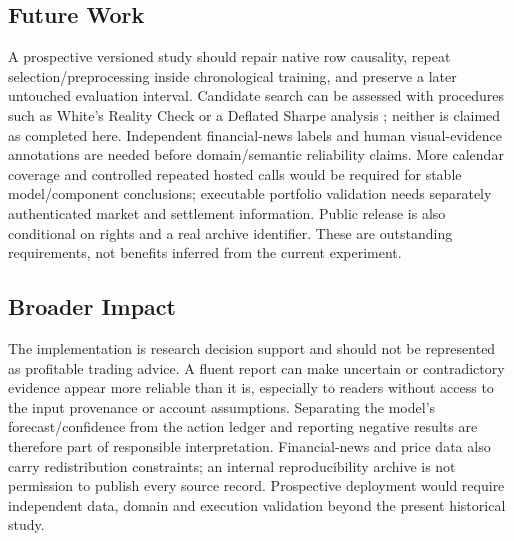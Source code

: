\subsection{Future Work}
A prospective versioned study should repair native row causality, repeat selection/preprocessing inside chronological training, and preserve a later untouched evaluation interval. Candidate search can be assessed with procedures such as White's Reality Check or a Deflated Sharpe analysis \cite{white2000reality,bailey2014deflated}; neither is claimed as completed here. Independent financial-news labels and human visual-evidence annotations are needed before domain/semantic reliability claims. More calendar coverage and controlled repeated hosted calls would be required for stable model/component conclusions; executable portfolio validation needs separately authenticated market and settlement information. Public release is also conditional on rights and a real archive identifier. These are outstanding requirements, not benefits inferred from the current experiment. \subsection{Broader Impact}
The implementation is research decision support and should not be represented as profitable trading advice. A fluent report can make uncertain or contradictory evidence appear more reliable than it is, especially to readers without access to the input provenance or account assumptions. Separating the model's forecast/confidence from the action ledger and reporting negative results are therefore part of responsible interpretation. Financial-news and price data also carry redistribution constraints; an internal reproducibility archive is not permission to publish every source record. Prospective deployment would require independent data, domain and execution validation beyond the present historical study.
